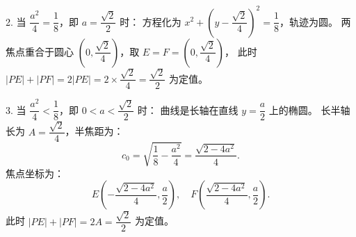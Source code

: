 \begin{answer}
2. 当 $\dfrac{a^2}{4} = \dfrac{1}{8}$，即 $a = \dfrac{\sqrt{2}}{2}$ 时：
   方程化为 $x^2 + \left(y - \dfrac{\sqrt{2}}{4}\right)^2 = \dfrac{1}{8}$，轨迹为圆。
   两焦点重合于圆心 $\left(0, \dfrac{\sqrt{2}}{4}\right)$，取 $E = F = \left(0, \dfrac{\sqrt{2}}{4}\right)$，
   此时 $|PE| + |PF| = 2|PE| = 2 \times \dfrac{\sqrt{2}}{4} = \dfrac{\sqrt{2}}{2}$ 为定值。

3. 当 $\dfrac{a^2}{4} < \dfrac{1}{8}$，即 $0 < a < \dfrac{\sqrt{2}}{2}$ 时：
   曲线是长轴在直线 $y = \dfrac{a}{2}$ 上的椭圆。
   长半轴长为 $A = \dfrac{\sqrt{2}}{4}$，半焦距为：
\nopagebreak[4]
\[c_0 = \sqrt{\frac{1}{8} - \frac{a^2}{4}} = \frac{\sqrt{2 - 4a^2}}{4}.\]
   焦点坐标为：
\nopagebreak[4]
\[E\left(-\frac{\sqrt{2 - 4a^2}}{4}, \frac{a}{2}\right), \quad F\left(\frac{\sqrt{2 - 4a^2}}{4}, \frac{a}{2}\right).\]
   此时 $|PE| + |PF| = 2A = \dfrac{\sqrt{2}}{2}$ 为定值。


\end{answer}
